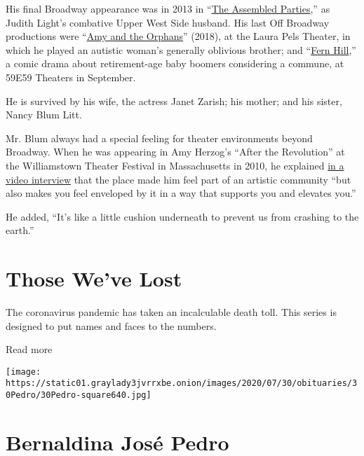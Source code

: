 His final Broadway appearance was in 2013 in
``\href{https://www.nytimes3xbfgragh.onion/2013/04/18/theater/reviews/the-assembled-parties-at-the-samuel-j-friedman-theater.html}{The
Assembled Parties},'' as Judith Light's combative Upper West Side
husband. His last Off Broadway productions were
``\href{https://www.nytimes3xbfgragh.onion/2018/03/01/theater/amy-and-the-orphans-review.html}{Amy
and the Orphans}'' (2018), at the Laura Pels Theater, in which he played
an autistic woman's generally oblivious brother; and
``\href{https://www.nytimes3xbfgragh.onion/2019/09/22/theater/fern-hill-review.html}{Fern
Hill},'' a comic drama about retirement-age baby boomers considering a
commune, at 59E59 Theaters in September.

He is survived by his wife, the actress Janet Zarish; his mother; and
his sister, Nancy Blum Litt.

Mr. Blum always had a special feeling for theater environments beyond
Broadway. When he was appearing in Amy Herzog's ``After the Revolution''
at the Williamstown Theater Festival in Massachusetts in 2010, he
explained \href{https://www.youtube.com/watch?v=tGvwH1mJYDg}{in a video
interview} that the place made him feel part of an artistic community
``but also makes you feel enveloped by it in a way that supports you and
elevates you.''

He added, ``It's like a little cushion underneath to prevent us from
crashing to the earth.''

\href{https://www.nytimes3xbfgragh.onion/interactive/2020/obituaries/people-died-coronavirus-obituaries.html?action=click\&pgtype=Article\&state=default\&region=BELOW_MAIN_CONTENT\&context=covid_obits_promo}{}

\hypertarget{those-weve-lost}{%
\section{Those We've Lost}\label{those-weve-lost}}

The coronavirus pandemic has taken an incalculable death toll. This
series is designed to put names and faces to the numbers.

Read more

\texttt{[image: https://static01.graylady3jvrrxbe.onion/images/2020/07/30/obituaries/30Pedro/30Pedro-square640.jpg]}

\hypertarget{bernaldina-josuxe9-pedro}{%
\section{Bernaldina José Pedro}\label{bernaldina-josuxe9-pedro}}

